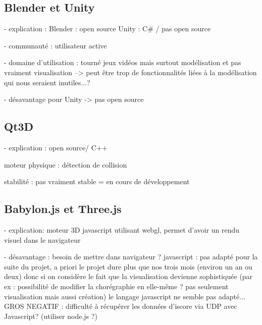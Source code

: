 \subsection{Blender et Unity}
- explication : Blender : open source
				Unity : C\# / pas open source
				
- communauté  : utilisateur active

- domaine d'utilisation : tourné jeux vidéos mais surtout modélisation et pas vraiment visualisation
--> peut être trop de fonctionnalités liées à la modélisation qui nous seraient inutiles...?

- désavantage pour Unity -> pas open source

\subsection{Qt3D}
- explication : open source/ C++

moteur physique : détection de collision

stabilité : pas vraiment stable = en cours de développement

\subsection{Babylon.js et Three.js}
- explication: moteur 3D javascript utilisant webgl, permet d'avoir un rendu visuel dans le navigateur

- désavantage : 
		besoin de mettre dans navigateur  ? 
	javascript : pas adapté pour la suite du projet, a priori le projet dure plus que nos trois mois (environ un an ou deux) donc si on considère le fait que la visualisation devienne sophistiquée (par ex : possibilité de modifier la chorégraphie en elle-même ? pas seulement visualisation mais aussi création) le langage javascript ne semble pas adapté...
		GROS NEGATIF : difficulté à récupérer les données d'iscore via UDP avec Javascript? (utiliser node.js ?)